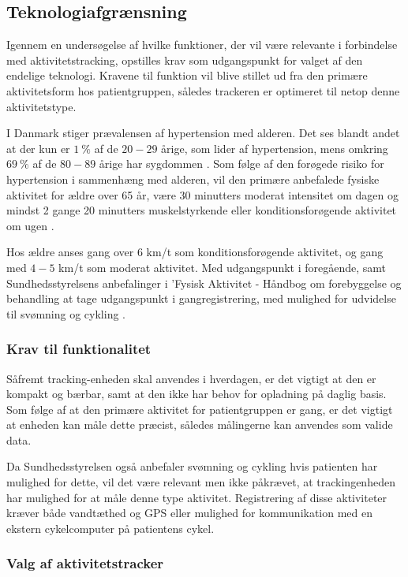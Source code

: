 \subsection{Teknologiafgrænsning}

Igennem en undersøgelse af hvilke funktioner, der vil være relevante i forbindelse med aktivitetstracking, opstilles krav som udgangspunkt for valget af den endelige teknologi. Kravene til funktion vil blive stillet ud fra den primære aktivitetsform hos patientgruppen, således trackeren er optimeret til netop denne aktivitetstype.

I Danmark stiger prævalensen af hypertension med alderen. Det ses blandt andet at der kun er $1~\%$ af de $20-29$ årige, som lider af hypertension, mens omkring $69~\%$ af de $80-89$ årige har sygdommen \citep{olsen2015}. Som følge af den forøgede risiko for hypertension i sammenhæng med alderen, vil den primære anbefalede fysiske aktivitet for ældre over 65 år, være 30 minutters moderat intensitet om dagen og mindst 2 gange 20 minutters muskelstyrkende eller konditionsforøgende aktivitet om ugen \citep{pedersen2011}.

Hos ældre anses gang over $6$ km/t som konditionsforøgende aktivitet, og gang med $4-5$ km/t som moderat aktivitet. Med udgangspunkt i foregående, samt Sundhedsstyrelsens anbefalinger i 'Fysisk Aktivitet - Håndbog om forebyggelse og behandling at tage udgangspunkt i gangregistrering, med mulighed for udvidelse til svømning og cykling \citep{pedersen2011}.

\subsubsection{Krav til funktionalitet}

Såfremt tracking-enheden skal anvendes i hverdagen, er det vigtigt at den er kompakt og bærbar, samt at den ikke har behov for opladning på daglig basis. Som følge af at den primære aktivitet for patientgruppen er gang, er det vigtigt at enheden kan måle dette præcist, således målingerne kan anvendes som valide data. 

Da Sundhedsstyrelsen også anbefaler svømning og cykling hvis patienten har mulighed for dette, vil det være relevant men ikke påkrævet, at trackingenheden har mulighed for at måle denne type aktivitet. Registrering af disse aktiviteter kræver både vandtæthed og GPS eller mulighed for kommunikation med en ekstern cykelcomputer på patientens cykel.

\subsubsection{Valg af aktivitetstracker}

